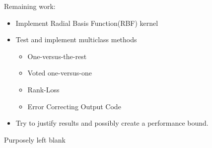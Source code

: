 \documentclass[10pt,fleqn]{article}%
\begin{document}
Remaining work:
\begin{itemize}
	\item Implement Radial Basis Function(RBF) kernel
	\item Test and implement multiclass methods	
	\begin{itemize}
		\item One-versus-the-rest
		\item Voted one-versus-one
		\item Rank-Loss
		\item Error Correcting Output Code
	\end{itemize}
	\item Try to justify results and possibly create a performance bound.
\end{itemize}

\appendix
\appendixpage

%

Purposely left blank
\end{document}
